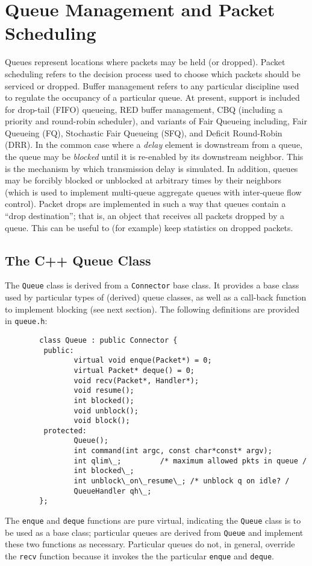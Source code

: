 \chapter{Queue Management and Packet Scheduling}
\label{chap:qmgmt}

Queues represent locations where packets may be held (or dropped).
Packet scheduling refers to the decision process used to choose
which packets should be serviced or dropped.
Buffer management refers to any particular discipline used
to regulate the occupancy of a particular queue.
At present, support is included for drop-tail (FIFO) queueing,
RED buffer management, CBQ (including a priority and round-robin scheduler), 
and
variants of Fair Queueing including, Fair Queueing (FQ),
Stochastic Fair Queueing (SFQ), and Deficit Round-Robin (DRR).
In the common case where a {\em delay} element is downstream from
a queue, the queue may be {\em blocked} until it is re-enabled
by its downstream neighbor.
This is the mechanism by which transmission delay is simulated.
In addition, queues may be forcibly blocked or unblocked at arbitrary
times by their neighbors (which is used to implement multi-queue
aggregate queues with inter-queue flow control).
Packet drops are implemented in such a way that queues contain
a ``drop destination''; that is, an object that receives all packets
dropped by a queue.
This can be useful to (for example) keep statistics on dropped packets.

\section{The C++ Queue Class}
\label{sec:qclass}

The {\tt Queue} class is derived from a {\tt Connector} base class.
It provides a base class used by particular types of (derived) queue classes,
as well as a call-back function to implement blocking (see next section).
The following definitions are provided in {\tt queue.h}:
\begin{verbatim}
        class Queue : public Connector {
         public:
                virtual void enque(Packet*) = 0;
                virtual Packet* deque() = 0;
                void recv(Packet*, Handler*);
                void resume();
                int blocked();
                void unblock();
                void block();
         protected:
                Queue();
                int command(int argc, const char*const* argv);
                int qlim\_;         /* maximum allowed pkts in queue /
                int blocked\_;
                int unblock\_on\_resume\_; /* unblock q on idle? /
                QueueHandler qh\_;
        };
\end{verbatim}
The {\tt enque} and {\tt deque} functions are pure virtual, indicating
the {\tt Queue} class is to be used as a base class;
particular queues are derived
from {\tt Queue} and implement these two functions as necessary.
Particular queues do not, in general, override the {\tt recv} function
because it invokes the
the particular {\tt enque} and {\tt deque}.

